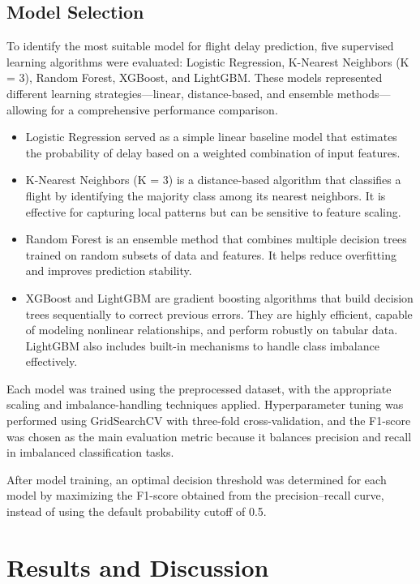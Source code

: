 \documentclass[a4paper,12pt]{report}
\begin{document}
\section{Model Selection}
To identify the most suitable model for flight delay prediction, five supervised learning algorithms were evaluated: Logistic Regression, K-Nearest Neighbors (K = 3), Random Forest, XGBoost, and LightGBM.
These models represented different learning strategies—linear, distance-based, and ensemble methods—allowing for a comprehensive performance comparison.
\begin{itemize}

\item Logistic Regression served as a simple linear baseline model that estimates the probability of delay based on a weighted combination of input features.
\item K-Nearest Neighbors (K = 3) is a distance-based algorithm that classifies a flight by identifying the majority class among its nearest neighbors. It is effective for capturing local patterns but can be sensitive to feature scaling.
\item Random Forest is an ensemble method that combines multiple decision trees trained on random subsets of data and features. It helps reduce overfitting and improves prediction stability.
\item XGBoost and LightGBM are gradient boosting algorithms that build decision trees sequentially to correct previous errors. They are highly efficient, capable of modeling nonlinear relationships, and perform robustly on tabular data. LightGBM also includes built-in mechanisms to handle class imbalance effectively.
\end{itemize}

Each model was trained using the preprocessed dataset, with the appropriate scaling and imbalance-handling techniques applied. Hyperparameter tuning was performed using GridSearchCV with three-fold cross-validation, and the F1-score was chosen as the main evaluation metric because it balances precision and recall in imbalanced classification tasks.

After model training, an optimal decision threshold was determined for each model by maximizing the F1-score obtained from the precision–recall curve, instead of using the default probability cutoff of 0.5.

\chapter{Results and Discussion}
\end{document}
